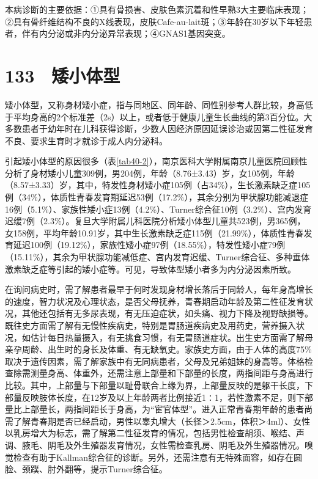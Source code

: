 本病诊断的主要依据：①具有骨损害、皮肤色素沉着和性早熟3大主要临床表现；②具有骨纤维结构不良的X线表现，皮肤Cafe-au-lait斑；③年龄在30岁以下年轻患者，伴有内分泌或非内分泌异常表现；④GNAS1基因突变。

\protect\hypertarget{text00313.html}{}{}

\section{133　矮小体型}

矮小体型，又称身材矮小症，指与同地区、同年龄、同性别参考人群比较，身高低于平均身高的2个标准差（2s）以上，或者低于健康儿童生长曲线的第3百分位。大多数患者于幼年时在儿科获得诊断，少数人因经济原因延误诊治或因第二性征发育不良、要求生育时才就诊于成人内分泌科。

引起矮小体型的原因很多（表\ref{tab40-2}），南京医科大学附属南京儿童医院回顾性分析了身材矮小儿童309例，男204例，年龄（8.76±3.43）岁，女105例，年龄（8.57±3.33）岁，其中，特发性身材矮小症105例（占34\%），生长激素缺乏症105例（34\%），体质性青春发育期延迟53例（17.2\%），其余分别为甲状腺功能减退症16例（5.1\%）、家族性矮小症13例（4.2\%）、Turner综合征10例（3.2\%）、宫内发育迟缓7例（2.3\%）。复旦大学附属儿科医院分析矮小体型儿童共523例，男365例，女158例，平均年龄10.91岁，其中生长激素缺乏症115例（21.99\%），体质性青春发育延迟100例（19.12\%），家族性矮小症97例（18.55\%），特发性矮小症79例（15.11\%），其余为甲状腺功能减低症、宫内发育迟缓、Turner综合征、多种垂体激素缺乏症等引起的矮小症等。可见，导致体型矮小者多为内分泌因素所致。

在询问病史时，需了解患者最早于何时发现身材增长落后于同龄人，每年身高增长的速度，智力状况及心理状态，是否父母抚养，青春期启动年龄及第二性征发育状况，其他还包括有无多尿表现，有无压迫症状，如头痛、视力下降及视野缺损等。既往史方面需了解有无慢性疾病史，特别是胃肠道疾病史及用药史，营养摄入状况，如估计每日热量摄入，有无挑食习惯，有无胃肠道症状。出生史方面需了解母亲孕周龄、出生时的身长及体重、有无缺氧史。家族史方面，由于人体的高度75\%取决于遗传因素，需了解家族中有无同病患者，父母及兄弟姐妹的身高等。体格检查除需测量身高、体重外，还需注意上部量和下部量的长度，两指间距与身高进行比较。其中，上部量与下部量以耻骨联合上缘为界，上部量反映的是躯干长度，下部量反映肢体长度，在12岁及以上年龄两者比例接近1∶1，若性激素不足，则下部量比上部量长，两指间距长于身高，为“宦官体型”。进入正常青春期年龄的患者尚需了解青春期是否已经启动，男性以睾丸增大（长径＞2.5cm，体积＞4ml）、女性以乳房增大为标志，需了解第二性征发育的情况，包括男性检查胡须、喉结、声调、腋毛、阴毛及外生殖器发育情况，女性需检查乳房、阴毛及外生殖器情况。嗅觉检查有助于Kallman综合征的诊断。另外，还需注意有无特殊面容，如存在圆脸、颈蹼、肘外翻等，提示Turner综合征。

